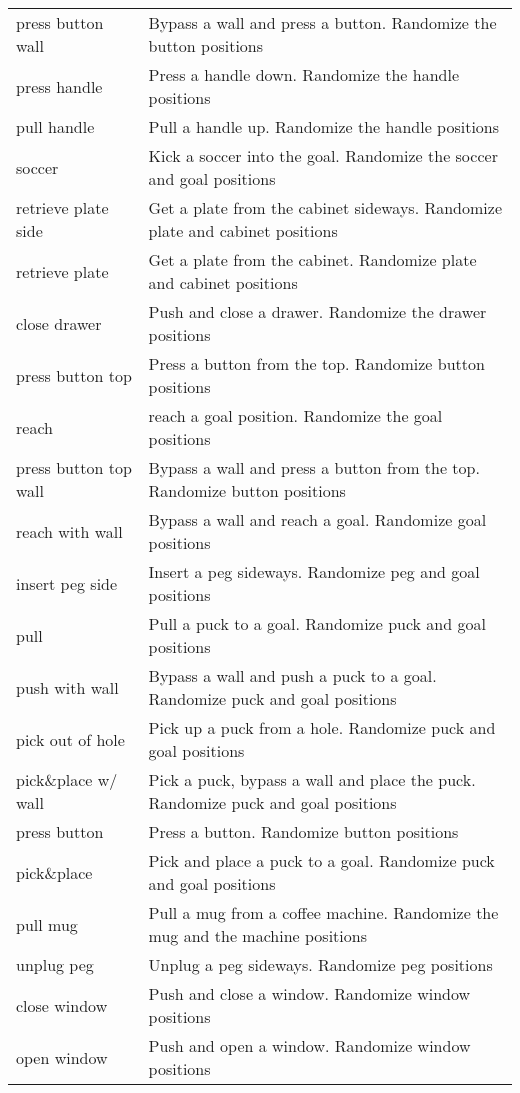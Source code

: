 \begin{table}[h]
\begin{tabular}{ll}
press button wall & Bypass a wall and press a button. Randomize the button positions\\
press handle & Press a handle down. Randomize the handle positions\\
pull handle & Pull a handle up. Randomize the handle positions\\
soccer & Kick a soccer into the goal. Randomize the soccer and goal positions\\
retrieve plate side & Get a plate from the cabinet sideways. Randomize plate and cabinet positions\\
retrieve plate & Get a plate from the cabinet. Randomize plate and cabinet positions\\
close drawer & Push and close a drawer. Randomize the drawer positions\\
press button top & Press a button from the top. Randomize button positions\\
reach & reach a goal position. Randomize the goal positions\\
press button top wall & Bypass a wall and press a button from the top. Randomize button positions\\
reach with wall & Bypass a wall and reach a goal. Randomize goal positions\\
insert peg side & Insert a peg sideways. Randomize peg and goal positions\\
pull & Pull a puck to a goal. Randomize puck and goal positions\\
push with wall & Bypass a wall and push a puck to a goal. Randomize puck and goal positions\\
pick out of hole & Pick up a puck from a hole. Randomize puck and goal positions\\
pick\&place w/ wall & Pick a puck, bypass a wall and place the puck. Randomize puck and goal positions\\
press button & Press a button. Randomize button positions\\
pick\&place & Pick and place a puck to a goal. Randomize puck and goal positions\\
pull mug & Pull a mug from a coffee machine. Randomize the mug and the machine positions\\
unplug peg & Unplug a peg sideways. Randomize peg positions\\
close window & Push and close a window. Randomize window positions\\
open window & Push and open a window. Randomize window positions\\

\end{tabular}
\end{table}
